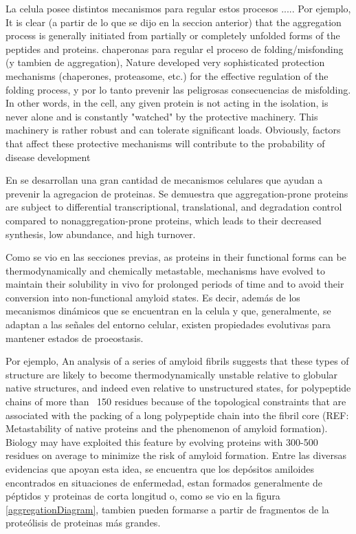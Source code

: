 La celula posee distintos mecanismos para regular estos procesos .....
Por ejemplo, 
It  is  clear (a partir de lo que se dijo en la seccion anterior)  that  the aggregation  process  is  generally   initiated  from  partially  or completely  unfolded  forms  of  the  peptides  and  proteins. 
chaperonas para regular el proceso de folding/misfonding (y tambien de aggregation), 
Nature developed very sophisticated protection mechanisms (chaperones, proteasome, etc.) for the effective regulation of the folding process, y por lo tanto prevenir las peligrosas consecuencias de misfolding. 
In other words, in the cell, any given protein is not acting in the isolation, is never alone and is constantly "watched" by the protective machinery. This machinery is rather robust and can
tolerate significant loads. Obviously, factors that affect these protective mechanisms will contribute to the probability of disease development



En \cite{gsponer2012cellular} se desarrollan una gran cantidad de mecanismos celulares que ayudan a prevenir la agregacion de proteinas. 
Se demuestra que aggregation-prone proteins are subject to differential transcriptional, translational, and degradation control compared to nonaggregation-prone proteins, which leads to their decreased
synthesis, low abundance, and high turnover. 

Como se vio en las secciones previas, 
as proteins in their functional forms can be thermodynamically and chemically metastable, mechanisms have evolved to maintain their solubility in vivo for prolonged periods of
time and to avoid their conversion into non-functional amyloid states.
Es decir, además de los mecanismos dinámicos que se encuentran en la celula y que, generalmente, se adaptan a las señales del entorno celular, existen propiedades evolutivas para mantener estados de proeostasis.

Por ejemplo, 
An analysis of a series of amyloid fibrils suggests that these types of structure are likely to become thermodynamically unstable relative to globular native structures, and indeed even relative to unstructured states, for
polypeptide chains of more than ~150 residues because of the topological constraints that are associated with the
packing of a long polypeptide chain into the fibril core (REF: Metastability of native proteins and the phenomenon of amyloid formation).
Biology may have exploited this feature by evolving proteins with 300-500 residues on average to minimize the risk of amyloid formation. 
Entre las diversas evidencias que apoyan esta idea, se encuentra que los depósitos amiloides encontrados en situaciones de enfermedad, 
estan formados generalmente de péptidos y proteinas de corta longitud o, como se vio en la figura \ref{aggregationDiagram}, tambien pueden formarse a partir de fragmentos de la proteólisis de proteinas más grandes.



